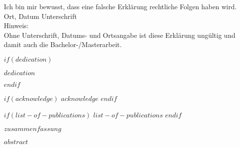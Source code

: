 \documentclass[a4paper,11pt]{article}
\begin{document}
Ich bin mir bewusst, dass eine falsche Erklärung rechtliche Folgen haben wird. \\




Ort, Datum \hspace{4cm}				Unterschrift \\

Hinweis: \\
Ohne Unterschrift, Datums- und Ortsangabe ist diese Erklärung ungültig und damit auch die Bachelor-/Masterarbeit.\\

\newpage


\pagebreak
\thispagestyle{empty}
\null
\newpage

$if(dedication)$
\null
\vspace{5cm}
\begin{center}
\textit{$dedication$}
\end{center}
\newpage\null\thispagestyle{empty}\newpage
$endif$


$if(acknowledge)$
\newpage
$acknowledge$
$endif$
\pagestyle{plain}
\setcounter{page}{1}    %
\newpage\null\thispagestyle{empty}\newpage


$if(list-of-publications)$
$list-of-publications$
\newpage\null\thispagestyle{empty}\newpage
$endif$


$zusammenfassung$
\newpage\null\thispagestyle{empty}\newpage


$abstract$
\newpage\null\thispagestyle{empty}\newpage

\newpage
\tableofcontents
\clearpage
\end{document}
